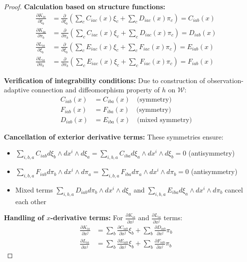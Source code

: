 \documentclass[10pt,a4paper]{amsart}
\begin{document}
\begin{proof}
\textbf{Calculation based on structure functions:}
\begin{align*}
\frac{\partial K_{ia}}{\partial \xi_b} &= \frac{\partial}{\partial \xi_b}\left(\sum_c C_{iac}(x)\xi_c + \sum_c D_{iac}(x)\pi_c\right) = C_{iab}(x)\\
\frac{\partial K_{ia}}{\partial \pi_b} &= \frac{\partial}{\partial \pi_b}\left(\sum_c C_{iac}(x)\xi_c + \sum_c D_{iac}(x)\pi_c\right) = D_{iab}(x)\\
\frac{\partial L_{ia}}{\partial \xi_b} &= \frac{\partial}{\partial \xi_b}\left(\sum_c E_{iac}(x)\xi_c + \sum_c F_{iac}(x)\pi_c\right) = E_{iab}(x)\\
\frac{\partial L_{ia}}{\partial \pi_b} &= \frac{\partial}{\partial \pi_b}\left(\sum_c E_{iac}(x)\xi_c + \sum_c F_{iac}(x)\pi_c\right) = F_{iab}(x)
\end{align*}

\textbf{Verification of integrability conditions:}
Due to construction of observation-adaptive connection and diffeomorphism property of $h$ on $\mathcal{W}$:
\begin{align*}
C_{iab}(x) &= C_{iba}(x) \quad \text{(symmetry)}\\
F_{iab}(x) &= F_{iba}(x) \quad \text{(symmetry)}\\
D_{iab}(x) &= E_{iba}(x) \quad \text{(mixed symmetry)}
\end{align*}

\textbf{Cancellation of exterior derivative terms:}
These symmetries ensure:
\begin{itemize}
\item $\sum_{i,b,a} C_{iab} d\xi_b \wedge dx^i \wedge d\xi_a = \sum_{i,b,a} C_{iba} d\xi_a \wedge dx^i \wedge d\xi_b = 0$ (antisymmetry)
\item $\sum_{i,b,a} F_{iab} d\pi_b \wedge dx^i \wedge d\pi_a = \sum_{i,b,a} F_{iba} d\pi_a \wedge dx^i \wedge d\pi_b = 0$ (antisymmetry)
\item Mixed terms $\sum_{i,b,a} D_{iab} d\pi_b \wedge dx^i \wedge d\xi_a$ and $\sum_{i,b,a} E_{iba} d\xi_a \wedge dx^i \wedge d\pi_b$ cancel each other
\end{itemize}

\textbf{Handling of $x$-derivative terms:}
For $\frac{\partial K_{ia}}{\partial x^j}$ and $\frac{\partial L_{ia}}{\partial x^j}$ terms:
\begin{align*}
\frac{\partial K_{ia}}{\partial x^j} &= \sum_b \frac{\partial C_{iab}}{\partial x^j}\xi_b + \sum_b \frac{\partial D_{iab}}{\partial x^j}\pi_b\\
\frac{\partial L_{ia}}{\partial x^j} &= \sum_b \frac{\partial E_{iab}}{\partial x^j}\xi_b + \sum_b \frac{\partial F_{iab}}{\partial x^j}\pi_b
\end{align*}


\end{proof}
\end{document}
